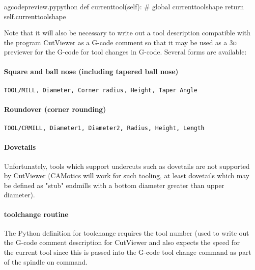 \documentclass{ltxdoc}
\begin{document}
\lstset{firstnumber=\thegcpy}
\begin{writecode}{a}{gcodepreview.py}{python}
    def currenttool(self):
#        global currenttoolshape
        return self.currenttoolshape

\end{writecode}
\addtocounter{gcpy}{4}

Note that it will also be necessary to write out a tool description compatible with the program CutViewer as a G-code comment so that it may be used as a \textsc{3d} previewer for the G-code for tool changes in G-code. Several forms are available:

\paragraph{Square and ball nose (including tapered ball nose)}

\begin{verbatim}
TOOL/MILL, Diameter, Corner radius, Height, Taper Angle
\end{verbatim}

\paragraph{Roundover (corner rounding)}

\begin{verbatim}
TOOL/CRMILL, Diameter1, Diameter2, Radius, Height, Length
\end{verbatim}

\paragraph{Dovetails}

Unfortunately, tools which support undercuts such as dovetails are not supported by CutViewer (CAMotics will work for such tooling, at least dovetails which may be defined as "stub" endmills with a bottom diameter greater than upper diameter).

\paragraph{toolchange routine}

The Python definition for toolchange requires the tool number (used to write out the G-code comment description for CutViewer and also expects the speed for the current tool since this is passed into the G-code tool change command as part of the spindle on command.
\end{document}
